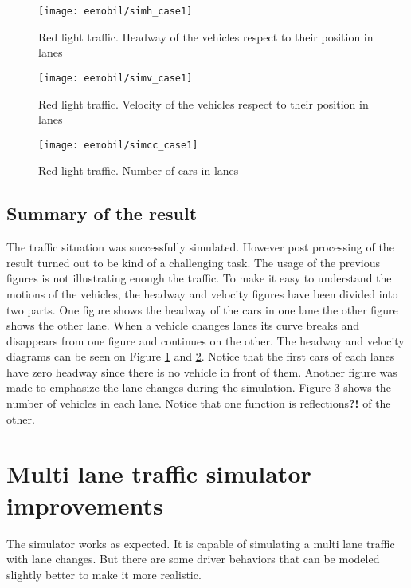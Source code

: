 		\begin{figure}
			\centering
			\texttt{[image: eemobil/simh\_case1]}
			\caption{Red light traffic. Headway of the vehicles respect to their position in lanes}
			\label{fig:red_light_situationh}
		\end{figure}
		\begin{figure}
			\centering
			\texttt{[image: eemobil/simv\_case1]}
			\caption{Red light traffic. Velocity of the vehicles respect to their position in lanes}
			\label{fig:red_light_situationv}
		\end{figure}
		\begin{figure}
			\centering
			\texttt{[image: eemobil/simcc\_case1]}
			\caption{Red light traffic. Number of cars in lanes }
			\label{fig:red_light_situationcc}
		\end{figure}
		\subsection*{Summary of the result}
		The traffic situation was successfully simulated. However post processing of the result turned out to be kind of a challenging task. The usage of the previous figures is not illustrating enough the traffic. To make it easy to understand the motions of the vehicles, the headway and velocity figures have been divided into two parts. One figure shows the headway of the cars in one lane the other figure shows the other lane. When a vehicle changes lanes its curve breaks and disappears from one figure and continues on the other. The headway and velocity diagrams can be seen on Figure \ref{fig:red_light_situationh} and \ref{fig:red_light_situationv}. Notice that the first cars of each lanes have zero headway since there is no vehicle in front of them.  Another figure was made to emphasize the lane changes during the simulation. Figure \ref{fig:red_light_situationcc} shows the number of vehicles in each lane. Notice that one function is reflections\textbf{?!} of the other.
		\section{Multi lane traffic simulator improvements}
		The simulator works as expected. It is capable of simulating a multi lane traffic with lane changes. But there are some driver behaviors that can be modeled slightly better to make it more realistic.
